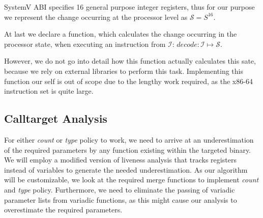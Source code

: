 SystemV ABI specifies 16 general purpose integer registers, thus for our purpose we represent the change occurring at the processor level as $\mathcal{S} = S^{16}$.

At last we declare a function, which calculates the change occurring in the processor state, when executing an instruction from $\mathcal{I}$:
$decode : \mathcal{I} \mapsto \mathcal{S}$.

However, we do not go into detail how this function actually calculates this sate, because we rely on external libraries to perform this task. Implementing this function our self is out of scope due to the lengthy work required, as the x86-64 instruction set is quite large.
    
\subsection{Calltarget Analysis}
\label{section:calltargetanalysis}
For either \emph{count} or \emph{type} policy to work, we need to arrive at an underestimation of the required parameters by any function existing within the targeted 
binary. We will employ a modified version of liveness analysis that tracks registers instead of variables to generate the needed underestimation. As our algorithm will 
be customizable, we look at the required merge functions to implement \emph{count} and \emph{type} policy. Furthermore, we need to eliminate the passing of variadic 
parameter lists from variadic functions, as this might cause our analysis to overestimate the required parameters.

